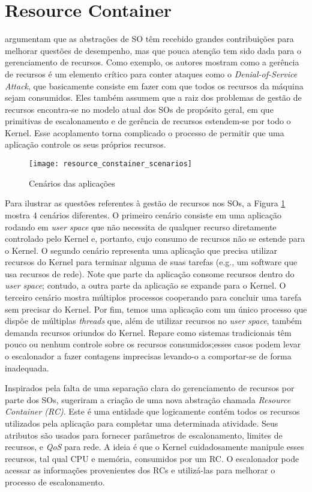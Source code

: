 \section{Resource Container}
\label{sec:rc}

\citet{resourcecontainers} argumentam que as abstrações de SO têm recebido
grandes contribuições para melhorar questões de desempenho, mas que
pouca atenção tem sido dada para o gerenciamento de recursos. Como exemplo, os
autores mostram como a gerência de recursos é um elemento crítico para conter
ataques como o \emph{Denial-of-Service Attack}, que basicamente consiste em fazer
com que todos os recursos da máquina sejam consumidos. Eles também
assumem que a raiz dos problemas de gestão de
recursos encontra-se no modelo atual dos SOs de propósito geral, em
que primitivas de escalonamento e de gerência de recursos estendem-se por todo
o Kernel. Esse acoplamento torna complicado o processo de permitir que uma
aplicação controle os seus próprios recursos.

\begin{figure}[!h]
  \centering
  \texttt{[image: resource\_constainer\_scenarios]} 
  \caption{Cenários das aplicações}
  \label{fig:resource_constainer_scenarios}
\end{figure}

Para ilustrar as questões referentes à gestão de recursos nos SOs, a Figura
\ref{fig:resource_constainer_scenarios} mostra 4 cenários diferentes. O
primeiro cenário consiste em uma aplicação rodando em \textit{user space} que
não necessita de qualquer recurso diretamente controlado pelo Kernel e,
portanto, cujo consumo de recursos não se estende para o Kernel. O segundo
cenário representa uma aplicação que precisa utilizar recursos do Kernel para
terminar alguma de suas tarefas (e.g., um software que usa recursos de rede).
Note que parte da aplicação consome recursos dentro do \textit{user space};
contudo, a outra parte da aplicação se expande para o Kernel. O terceiro cenário
mostra múltiplos processos cooperando para concluir uma tarefa sem precisar
do Kernel. Por fim, temos uma aplicação com um único processo que dispõe de
múltiplas \emph{threads} que, além de utilizar recursos no \textit{user space}, também
demanda recursos oriundos do Kernel. Repare como sistemas tradicionais têm
pouco ou nenhum controle sobre os recursos consumidos;esses casos
podem levar o escalonador a fazer contagens imprecisas levando-o a
comportar-se de forma inadequada.

Inspirados pela falta de uma separação clara do gerenciamento de recursos por
parte dos SOs, \citet{resourcecontainers} sugeriram a criação de uma nova
abstração chamada \emph{Resource Container (RC)}. Este é uma entidade que
logicamente contém todos os recursos utilizados pela aplicação para completar
uma determinada atividade. Seus atributos são usados para fornecer parâmetros
de escalonamento, limites de recursos, e \emph{QoS} para rede. A ideia é que o
Kernel cuidadosamente manipule esses recursos, tal qual CPU e memória, consumidos
por um RC. O escalonador pode acessar as informações provenientes dos RCs e
utilizá-las para melhorar o processo de escalonamento.

